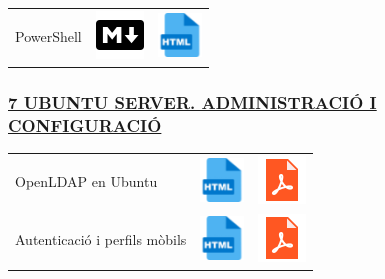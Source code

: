 \documentclass[
  12 pt,
  a4paper,
]{article}
\begin{document}
\begin{longtable}[]{@{}
  >{\raggedright\arraybackslash}p{}
  >{\raggedright\arraybackslash}p{}
  >{\raggedright\arraybackslash}p{}@{}}
\toprule\noalign{}
\endhead
\bottomrule\noalign{}
\endlastfoot
PowerShell &
\href{U5-POWERSHELL/script.md}{\includegraphics{recursos/iconomd.png}} &
\href{U5-POWERSHELL/script.html}{\includegraphics{recursos/iconohtml.png}} \\
\end{longtable}

\subsubsection{\texorpdfstring{\hyperref[U7]{7 UBUNTU SERVER.
ADMINISTRACIÓ I
CONFIGURACIÓ}}{7 UBUNTU SERVER. ADMINISTRACIÓ I CONFIGURACIÓ}}\label{ubuntu-server.-administraciuxf3-i-configuraciuxf3}

\begin{longtable}[]{@{}
  >{\raggedright\arraybackslash}p{}
  >{\raggedright\arraybackslash}p{}
  >{\raggedright\arraybackslash}p{}@{}}
\toprule\noalign{}
\endhead
\bottomrule\noalign{}
\endlastfoot
OpenLDAP en Ubuntu &
\href{UD7_OpenLDAP/UD7_OpenLDAP.html}{\includegraphics{recursos/iconohtml.png}}
&
\href{UD7_OpenLDAP/UD7_OpenLDAP.pdf}{\includegraphics{recursos/iconopdf.png}} \\
Autenticació i perfils mòbils &
\href{UD7_OpenLDAP/UD7_OpenLDAPAutenticarIPerfils.html}{\includegraphics{recursos/iconohtml.png}}
&
\href{UD7_OpenLDAP/UD7_OpenLDAPAutenticarIPerfils.pdf}{\includegraphics{recursos/iconopdf.png}} \\
\end{longtable}
\end{document}
